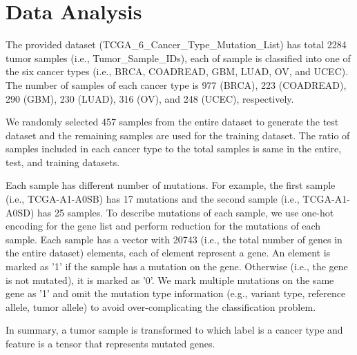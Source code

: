 \section{Data Analysis}

The provided dataset (TCGA\_6\_Cancer\_Type\_Mutation\_List) has total 2284 tumor samples (i.e., Tumor\_Sample\_IDs), each of sample is classified into one of the six cancer types (i.e., BRCA, COADREAD, GBM, LUAD, OV, and UCEC). The number of samples of each cancer type is 977 (BRCA), 223 (COADREAD), 290 (GBM), 230 (LUAD), 316 (OV), and 248 (UCEC), respectively. 

We randomly selected 457 samples from the entire dataset to generate the test dataset and the remaining samples are used for the training dataset. The ratio of samples included in each cancer type to the total samples is same in the entire, test, and training datasets.

Each sample has different number of mutations. For example, the first sample (i.e., TCGA-A1-A0SB) has 17 mutations and the second sample (i.e., TCGA-A1-A0SD) has 25 samples. To describe mutations of each sample, we use one-hot encoding for the gene list and perform reduction for the mutations of each sample. Each sample has a vector with 20743 (i.e., the total number of genes in the entire dataset) elements, each of element represent a gene. An element is marked as '1' if the sample has a mutation on the gene. Otherwise (i.e., the gene is not mutated), it is marked as '0'. We mark multiple mutations on the same gene as '1' and omit the mutation type information (e.g., variant type, reference allele, tumor allele) to avoid over-complicating the classification problem.

In summary, a tumor sample is transformed to which label is a cancer type and feature is a tensor that represents mutated genes.
